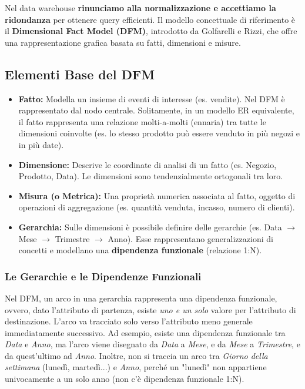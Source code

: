 Nel data warehouse \textbf{rinunciamo alla normalizzazione e accettiamo la ridondanza} per ottenere query efficienti. Il modello concettuale di riferimento è il \textbf{Dimensional Fact Model (DFM)}, introdotto da Golfarelli e Rizzi, che offre una rappresentazione grafica basata su fatti, dimensioni e misure.

\subsection{Elementi Base del DFM}

\begin{itemize}
    \item \textbf{Fatto:} Modella un insieme di eventi di interesse (es. vendite). Nel DFM è rappresentato dal nodo centrale. Solitamente, in un modello ER equivalente, il fatto rappresenta una relazione molti-a-molti (ennaria) tra tutte le dimensioni coinvolte (es. lo stesso prodotto può essere venduto in più negozi e in più date).
    \item \textbf{Dimensione:} Descrive le coordinate di analisi di un fatto (es. Negozio, Prodotto, Data). Le dimensioni sono tendenzialmente ortogonali tra loro.
    \item \textbf{Misura (o Metrica):} Una proprietà numerica associata al fatto, oggetto di operazioni di aggregazione (es. quantità venduta, incasso, numero di clienti).
    \item \textbf{Gerarchia:} Sulle dimensioni è possibile definire delle gerarchie (es. Data $\rightarrow$ Mese $\rightarrow$ Trimestre $\rightarrow$ Anno). Esse rappresentano generalizzazioni di concetti e modellano una \textbf{dipendenza funzionale} (relazione 1:N). 
\end{itemize}

\subsubsection{Le Gerarchie e le Dipendenze Funzionali}
Nel DFM, un arco in una gerarchia rappresenta una dipendenza funzionale, ovvero, dato l'attributo di partenza, esiste \textit{uno e un solo} valore per l'attributo di destinazione. 
L'arco va tracciato solo verso l'attributo meno generale immediatamente successivo. Ad esempio, esiste una dipendenza funzionale tra \textit{Data} e \textit{Anno}, ma l'arco viene disegnato da \textit{Data} a \textit{Mese}, e da \textit{Mese} a \textit{Trimestre}, e da quest'ultimo ad \textit{Anno}.
Inoltre, non si traccia un arco tra \textit{Giorno della settimana} (lunedì, martedì...) e \textit{Anno}, perché un "lunedì" non appartiene univocamente a un solo anno (non c'è dipendenza funzionale 1:N).

